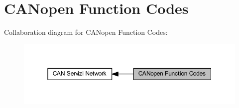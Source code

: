 \hypertarget{group___c_a_nopen___func___codes}{}\section{C\+A\+Nopen Function Codes}
\label{group___c_a_nopen___func___codes}
Collaboration diagram for C\+A\+Nopen Function Codes\+:\nopagebreak
\begin{figure}[H]
\begin{center}
\leavevmode
\includegraphics[width=350pt]{group___c_a_nopen___func___codes}
\end{center}
\end{figure}
